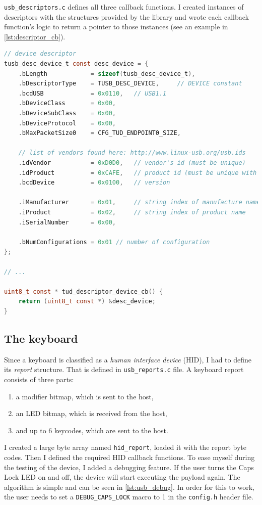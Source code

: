 \verb|usb_descriptors.c| defines all three callback functions. I created instances of descriptors with the structures provided by the library and wrote each callback function's logic to return a pointer to those instances (see an example in \autoref{lst:descriptor_cb}).

\begin{lstlisting}[caption={Definition of the \emph{device descriptor} and its callback function used in \texttt{usb\_descriptors.c}.},
                   label={lst:descriptor_cb},
                   language=c]
// device descriptor
tusb_desc_device_t const desc_device = {
    .bLength            = sizeof(tusb_desc_device_t),
    .bDescriptorType    = TUSB_DESC_DEVICE,     // DEVICE constant
    .bcdUSB             = 0x0110,   // USB1.1
    .bDeviceClass       = 0x00,
    .bDeviceSubClass    = 0x00,
    .bDeviceProtocol    = 0x00,
    .bMaxPacketSize0    = CFG_TUD_ENDPOINT0_SIZE,

    // list of vendors found here: http://www.linux-usb.org/usb.ids
    .idVendor           = 0xD0D0,   // vendor's id (must be unique)
    .idProduct          = 0xCAFE,   // product id (must be unique with vendor)
    .bcdDevice          = 0x0100,   // version

    .iManufacturer      = 0x01,     // string index of manufacture name
    .iProduct           = 0x02,     // string index of product name
    .iSerialNumber      = 0x00,

    .bNumConfigurations = 0x01 // number of configuration
};

// ...

uint8_t const * tud_descriptor_device_cb() {
    return (uint8_t const *) &desc_device;
}
\end{lstlisting}

\subsection{The keyboard}
Since a keyboard is classified as a \emph{human interface device} (HID), I had to define its \emph{report} structure. That is defined in \verb|usb_reports.c| file. A keyboard report consists of three parts:
\begin{enumerate}
    \item a modifier bitmap, which is sent to the host,
    \item an LED bitmap, which is received from the host,
    \item and up to 6 keycodes, which are sent to the host.
\end{enumerate}
I created a large byte array named \verb|hid_report|, loaded it with the report byte codes. Then I defined the required HID callback functions. To ease myself during the testing of the device, I added a debugging feature. If the user turns the Caps Lock LED on and off, the device will start executing the payload again. The algorithm is simple and can be seen in \autoref{lst:usb_debug}. In order for this to work, the user needs to set a \verb|DEBUG_CAPS_LOCK| macro to 1 in the \verb|config.h| header file.

